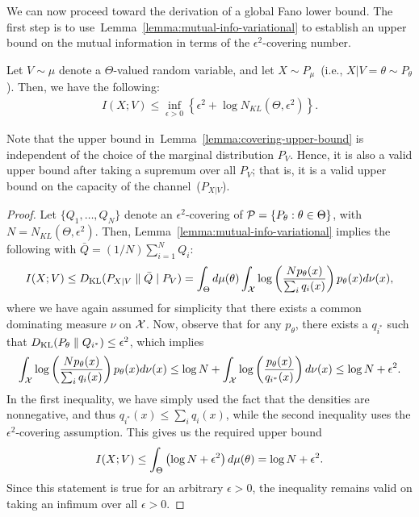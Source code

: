 \documentclass[12pt]{article}
\begin{document}
We can now proceed toward the derivation of a global Fano lower bound. The first step is to use~Lemma~\ref{lemma:mutual-info-variational} to establish an upper bound on the mutual information in terms of the $\epsilon^2$-covering number. 
\begin{lemma}
	\label{lemma:covering-upper-bound} Let $V \sim \mu$ denote a $\Theta$-valued random variable, and let $X \sim P_\mu$~(i.e., $X|V=\theta \sim P_\theta$). Then, we have the following:
	\begin{align}
		I(X; V) \leq \inf_{\epsilon>0} \left\{ \epsilon^2 + \log N_{KL}(\Theta, \epsilon^2) \right\}. 
	\end{align}
\end{lemma}
\begin{remark}
	Note that the upper bound in~Lemma~\ref{lemma:covering-upper-bound} is independent of the choice of the marginal distribution $P_V$. Hence, it is also a valid upper bound after taking a supremum over all $P_V$; that is, it is a valid upper bound on the capacity of the channel~($P_{X|V}$). 
\end{remark}
\begin{proof}
	Let $\{Q_1, \ldots, Q_N\}$ denote an $\epsilon^2$-covering of ${\cal P} = \{P_\theta: \theta \in \Theta\}$, with $N = N_{KL}(\Theta, \epsilon^2)$. Then, Lemma~\ref{lemma:mutual-info-variational} implies the following with $\bar{Q} = (1/N) \sum_{i=1}^N Q_i$:  
	\begin{align}
		I(X;V) \leq D_{\text{KL}}(P_{X|V} \parallel \bar{Q} \mid P_V) = \int_{\Theta} d\mu(\theta) \int_{{\cal X}} \log \left( \frac{N p_\theta(x)}{\sum_i q_i(x)} \right) p_\theta(x) d\nu(x), 
	\end{align}
	where we have again assumed for simplicity that there exists a common dominating measure $\nu$ on ${\cal X}$. Now, observe that for any $p_\theta$, there exists a $q_{i^*}$ such that $D_{\text{KL}}(P_\theta \parallel Q_{i^*}) \leq \epsilon^2$, which implies 
	\begin{align}
		\int_{{\cal X}} \log \left( \frac{N p_\theta(x)}{\sum_i q_i(x)} \right) p_\theta(x)d\nu(x) \leq \log N + \int_{{\cal X}}\log \left( \frac{p_\theta(x)}{q_{i^*}(x)} \right) d\nu(x) \leq \log N + \epsilon^2. 
	\end{align}
	In the first inequality, we have simply used the fact that the densities are nonnegative, and thus $q_{i^*}(x) \leq \sum_i q_i(x)$, while the second inequality uses the $\epsilon^2$-covering assumption. This gives us the required upper bound 
	\begin{align}
		I(X;V) \leq \int_{\Theta} \left( \log N + \epsilon^2 \right) d\mu(\theta) = \log N + \epsilon^2. 
	\end{align}
	Since this statement is true for an arbitrary $\epsilon>0$, the inequality remains valid on taking an infimum over all $\epsilon>0$. 
\end{proof}
\end{document}
